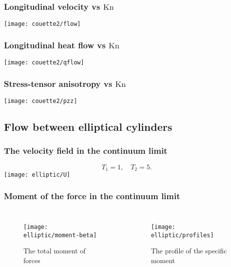 \documentclass[mathserif]{beamer} %
\newcommand{\Kn}{\mathrm{Kn}}
\begin{document}
\begin{frame}
    \frametitle{Longitudinal velocity vs \(\Kn\)}
    \vspace{-2pt}
    \centering\hspace{-1.5cm}
    \texttt{[image: couette2/flow]}
    \hspace{-1.5cm}
\end{frame}

\begin{frame}
    \frametitle{Longitudinal heat flow vs \(\Kn\)}
    \vspace{-2pt}
    \centering\hspace{-1.5cm}
    \texttt{[image: couette2/qflow]}
    \hspace{-1.5cm}
\end{frame}

\begin{frame}
    \frametitle{Stress-tensor anisotropy vs \(\Kn\)}
    \vspace{-2pt}
    \centering\hspace{-1.5cm}
    \texttt{[image: couette2/pzz]}
    \hspace{-1.5cm}
\end{frame}

\subsection{Flow between elliptical cylinders}

\begin{frame}
    \frametitle{The velocity field in the continuum limit}
    \[ T_1 = 1, \quad T_2 = 5.\]
    \centering
    \hspace{-1cm}
    \texttt{[image: elliptic/U]}
    \hspace{-1cm}
\end{frame}

\begin{frame}
    \frametitle{Moment of the force in the continuum limit}
    \begin{columns}
        \begin{figure}
            \texttt{[image: elliptic/moment-beta]}
            \caption{The total moment of forces}
        \end{figure}
        \begin{figure}
            \texttt{[image: elliptic/profiles]}
            \caption{The profile of the specific moment}
        \end{figure}
    \end{columns}
\end{frame}
\end{document}
